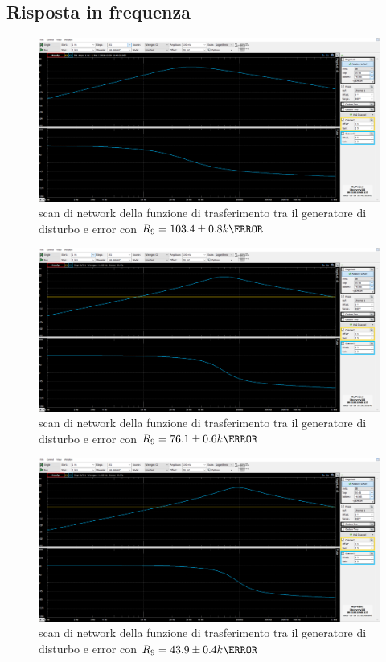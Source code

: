\documentclass[10pt, a4paper, italian]{article}
\begin{document}
\subsection{Risposta in frequenza}
\begin{figure}[H]
    \centering
	\includegraphics[scale=0.7]{103.4k}
    \caption{scan di network della funzione di trasferimento tra il generatore di disturbo e error con $R_9= 103.4 \pm 0.8 k\ohm$
    \label{fig: Draft1}}
\end{figure}
\begin{figure}[H]
    \centering
	\includegraphics[scale=0.7]{76.1k}
    \caption{scan di network della funzione di trasferimento tra il generatore di disturbo e error con $R_9=76.1 \pm 0.6 k\ohm$
    \label{fig: Draft1}}
\end{figure}
\begin{figure}[H]
    \centering
	\includegraphics[scale=0.7]{43.9k}
    \caption{scan di network della funzione di trasferimento tra il generatore di disturbo e error con $R_9= 43.9 \pm 0.4 k\ohm$
    \label{fig: Draft1}}
\end{figure}
\end{document}

